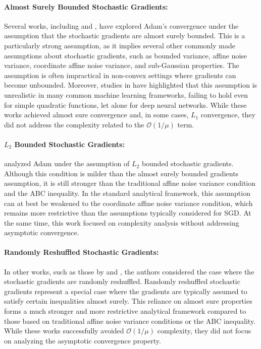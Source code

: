 \documentclass{article} %
\begin{document}
\paragraph{Almost Surely Bounded Stochastic Gradients:}
Several works, including \cite{he2023convergence} and \cite{xiao2024adam}, have explored Adam's convergence under the assumption that the stochastic gradients are almost surely bounded. This is a particularly strong assumption, as it implies several other commonly made assumptions about stochastic gradients, such as bounded variance, affine noise variance, coordinate affine noise variance, and sub-Gaussian properties. The assumption is often impractical in non-convex settings where gradients can become unbounded. Moreover, studies in \cite{wang2023convergence} have highlighted that this assumption is unrealistic in many common machine learning frameworks, failing to hold even for simple quadratic functions, let alone for deep neural networks. While these works achieved almost sure convergence and, in some cases, $L_1$ convergence, they did not address the complexity related to the $\mathcal{O}(1/\mu)$ term.
\paragraph{$L_2$ Bounded Stochastic Gradients:}
\cite{zou2019sufficient} analyzed Adam under the assumption of $L_2$ bounded stochastic gradients. Although this condition is milder than the almost surely bounded gradients assumption, it is still stronger than the traditional affine noise variance condition and the ABC inequality. In the standard analytical framework, this assumption can at best be weakened to the coordinate affine noise variance condition, which remains more restrictive than the assumptions typically considered for SGD. At the same time, this work focused on complexity analysis without addressing asymptotic convergence.
\paragraph{Randomly Reshuffled Stochastic Gradients:}
In other works, such as those by \cite{zhang2022adam} and \cite{wang2024provable}, the authors considered the case where the stochastic gradients are randomly reshuffled. Randomly reshuffled stochastic gradients represent a special case where the gradients are typically assumed to satisfy certain inequalities almost surely. This reliance on almost sure properties forms a much stronger and more restrictive analytical framework compared to those based on traditional affine noise variance conditions or the ABC inequality. While these works successfully avoided $\mathcal{O}(1/\mu)$ complexity, they did not focus on analyzing the asymptotic convergence property.
\end{document}
